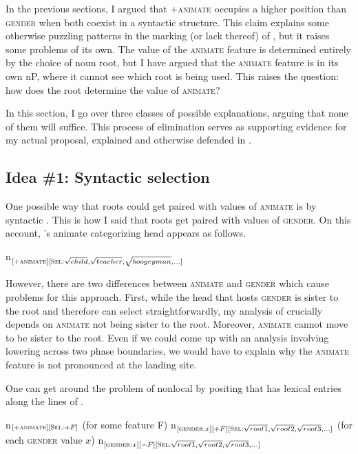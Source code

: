 \documentclass[output=paper,newtxmath,modfonts,nonflat,hidelinks]{langsci/langscibook}
\begin{document}
In the previous sections, I argued that +\textsc{animate} occupies a higher position than \textsc{gender} when both coexist in a syntactic structure.  This claim explains some otherwise puzzling patterns in the marking (or lack thereof) of , but it raises some problems of its own.  The value of the \textsc{animate} feature is determined entirely by the choice of noun root, but I have argued that the \textsc{animate} feature is in its own nP, where it cannot see which root is being used.  This raises the question: how does the root determine the value of \textsc{animate}?

In this section, I go over three classes of possible explanations, arguing that none of them will suffice.  This process of elimination serves as supporting evidence for my actual proposal, explained and otherwise defended in .

\subsection{Idea \#1: Syntactic selection} \label{sec:pesetsky:syntacticselectionidea}
\largerpage
One possible way that roots could get paired with values of \textsc{animate} is by syntactic .  This is how I said that roots get paired with values of \textsc{gender}.  On this account, 's animate categorizing head appears as follows.

\ea\label{ex:pesetsky:optiona}  n$_{[+\textsc{animate}][\textsc{Sel}: \sqrt{child}, \sqrt{teacher}, \sqrt{boogeyman}, ...]}$  \z

However, there are two differences between \textsc{animate} and \textsc{gender} which cause problems for this approach.  First, while the head that hosts \textsc{gender} is sister to the root and therefore can select straightforwardly, my analysis of  crucially depends on \textsc{animate} not being sister to the root.  Moreover, \textsc{animate} cannot move to be sister to the root.  Even if we could come up with an analysis involving lowering across two phase boundaries, we would have to explain why the \textsc{animate} feature is not pronounced at the landing site.

One can get around the problem of nonlocal  by positing that  has lexical entries along the lines of .

\ea\label{ex:pesetsky:optionb} \ea n$_{[+\textsc{animate}][\textsc{Sel}:+F]}$ (for some feature F) 
\ex  n$_{[\textsc{gender}:x][+F][\textsc{Sel}: \sqrt{root1}, \sqrt{root2}, \sqrt{root3}, ...]}$ (for each \textsc{gender} value $x$) 
\ex n$_{[\textsc{gender}:x][-F][\textsc{Sel}: \sqrt{root1}, \sqrt{root2}, \sqrt{root3}, ...]}$ \\ \z \z
\end{document}
